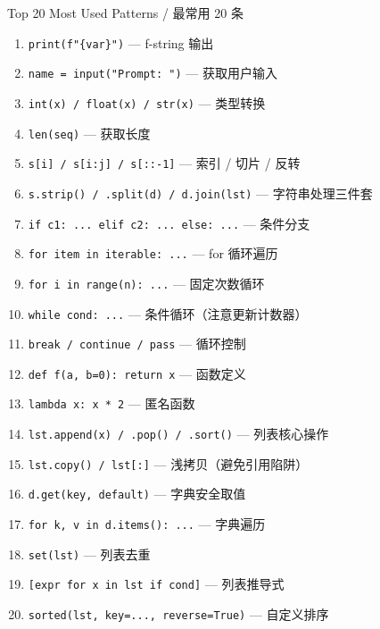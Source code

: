 \documentclass[11pt,a4paper]{report}
\let\oldtexttt\texttt
\renewcommand{\texttt}[1]{\textcolor{mainblue}{\oldtexttt{#1}}}
\begin{document}
\begin{concept}{Top 20 Most Used Patterns / 最常用 20 条}
\begin{enumerate}[itemsep=0.4em]
    \item \texttt{print(f"\{var\}")} — f-string 输出
    \item \texttt{name = input("Prompt: ")} — 获取用户输入
    \item \texttt{int(x) / float(x) / str(x)} — 类型转换
    \item \texttt{len(seq)} — 获取长度
    \item \texttt{s[i] / s[i:j] / s[::-1]} — 索引 / 切片 / 反转
    \item \texttt{s.strip() / .split(d) / d.join(lst)} — 字符串处理三件套
    \item \texttt{if c1: ... elif c2: ... else: ...} — 条件分支
    \item \texttt{for item in iterable: ...} — for 循环遍历
    \item \texttt{for i in range(n): ...} — 固定次数循环
    \item \texttt{while cond: ...} — 条件循环（注意更新计数器）
    \item \texttt{break / continue / pass} — 循环控制
    \item \texttt{def f(a, b=0): return x} — 函数定义
    \item \texttt{lambda x: x * 2} — 匿名函数
    \item \texttt{lst.append(x) / .pop() / .sort()} — 列表核心操作
    \item \texttt{lst.copy() / lst[:]} — 浅拷贝（避免引用陷阱）
    \item \texttt{d.get(key, default)} — 字典安全取值
    \item \texttt{for k, v in d.items(): ...} — 字典遍历
    \item \texttt{set(lst)} — 列表去重
    \item \texttt{[expr for x in lst if cond]} — 列表推导式
    \item \texttt{sorted(lst, key=..., reverse=True)} — 自定义排序
\end{enumerate}
\end{concept}

\vspace{1cm}
\end{document}
